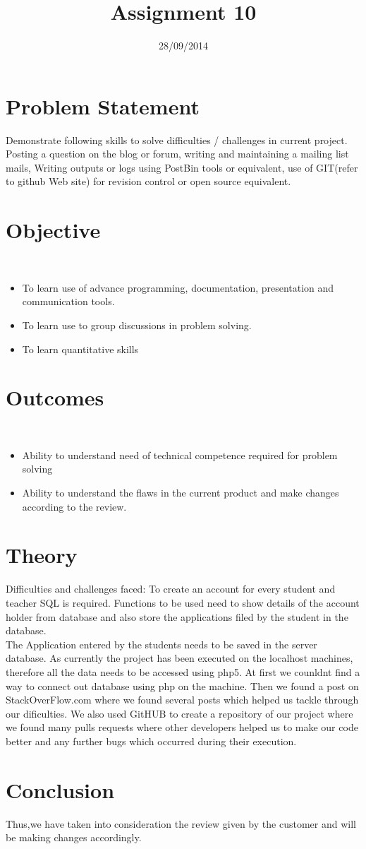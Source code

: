 \documentclass[11pt]{article}
\title{Assignment 10}
\date{ 28/09/2014}
\begin{document}
\maketitle

\section*{Problem Statement}
Demonstrate following skills to solve difficulties / challenges in current project.
Posting a question on the blog or forum, 
writing and maintaining a mailing list mails, 
Writing outputs or logs using PostBin tools or equivalent, 
use of GIT(refer to github Web site) for revision control or open source equivalent.
\section*{Objective}\
\begin{itemize}
\item To learn use of advance programming, documentation, presentation and communication tools.
\item To learn use to group discussions in problem solving.
\item To learn quantitative skills
\end{itemize}

\section*{Outcomes}\
\begin{itemize}
\item Ability to understand need of technical competence required for problem solving
\item Ability to understand the flaws in the current product and make changes according to the review.
\end{itemize}

\section*{Theory}
Difficulties and challenges faced:
To create an account for every student and teacher SQL is required. Functions to be used need to show details of the account holder from database and also store the applications filed by the student in the database. \\
The Application entered by the students needs to be saved in the server database. As currently the project has been executed on the localhost machines, therefore all the data needs to be accessed using php5. At first we counldnt find a way to connect out database using php on the machine. Then we found a post on StackOverFlow.com where we found several posts which helped us tackle through our dificulties. We also used GitHUB to  create a repository of our project where we found many pulls requests where other developers helped us to make our code better and any further bugs which occurred during their execution.
\section*{Conclusion}
Thus,we have taken into consideration the review given by the customer and will be making changes accordingly.
\end{document}
